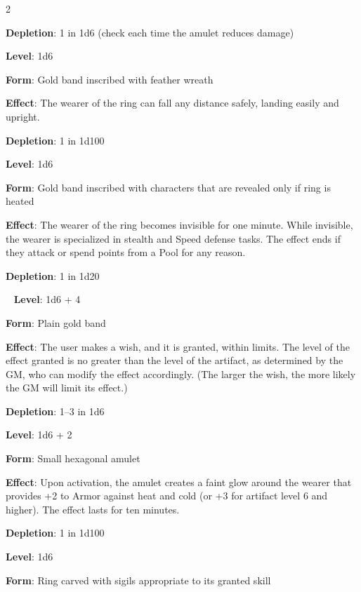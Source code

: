 \begin{multicols}{2}

\textbf{Depletion}: 1 in 1d6 (check each time the amulet reduces damage)


\textbf{Level}: 1d6 

\textbf{Form}: Gold band inscribed with feather wreath 

\textbf{Effect}: The wearer of the ring can fall any distance safely, landing easily and upright. 

\textbf{Depletion}: 1 in 1d100 


\textbf{Level}: 1d6 

\textbf{Form}: Gold band inscribed with characters that are revealed only if ring is heated 

\textbf{Effect}: The wearer of the ring becomes invisible for one minute. While invisible, the wearer is specialized in stealth and Speed defense tasks. The effect ends if they attack or spend points from a Pool for any reason. 

\textbf{Depletion}: 1 in 1d20 

 
\textbf{Level}: 1d6 + 4 

\textbf{Form}: Plain gold band 

\textbf{Effect}: The user makes a wish, and it is granted, within limits. The level of the effect granted is no greater than the level of the artifact, as determined by the GM, who can modify the effect accordingly. (The larger the wish, the more likely the GM will limit its effect.) 

\textbf{Depletion}: 1–3 in 1d6 


\textbf{Level}: 1d6 + 2 

\textbf{Form}: Small hexagonal amulet 

\textbf{Effect}: Upon activation, the amulet creates a faint glow around the wearer that provides +2 to Armor against heat and cold (or +3 for artifact level 6 and higher). The effect lasts for ten minutes. 

\textbf{Depletion}: 1 in 1d100


\textbf{Level}: 1d6 

\textbf{Form}: Ring carved with sigils appropriate to its granted skill 


\end{multicols}
